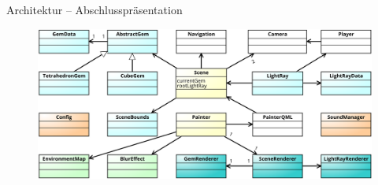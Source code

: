 \begin{frame}{Architektur -- Abschlusspräsentation}
	\begin{figure}
		\centering
		\includegraphics[width=\textwidth, height=0.7\textheight, keepaspectratio]{images/klassendiagramm-final}
	\end{figure}
\end{frame}

